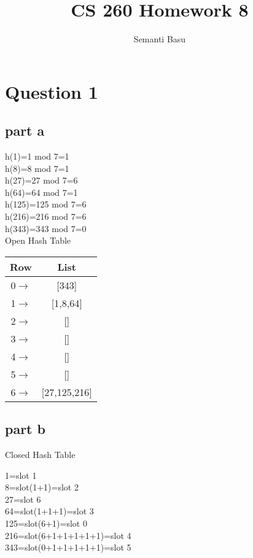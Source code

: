 \documentclass{article}
\begin{document}
\title {CS 260 Homework 8}
\author{Semanti Basu}
\maketitle


\section*{Question 1}
\subsection*{part a}
h(1)=1 mod 7=1\\
h(8)=8 mod 7=1\\
h(27)=27 mod 7=6\\
h(64)=64 mod 7=1\\
h(125)=125 mod 7=6\\
h(216)=216 mod 7=6\\
h(343)=343 mod 7=0\\

Open Hash Table



\begin{center}
\begin{tabular}{c|c|}
\hline
Row & List\\ \hline
0$\rightarrow$ & [343]\\ \hline
1$\rightarrow$ & [1,8,64]\\ \hline
2$\rightarrow$ & []\\ \hline
3$\rightarrow$ & []\\ \hline
4$\rightarrow$ & []\\ \hline
5$\rightarrow$ & []\\ \hline
6$\rightarrow$ & [27,125,216]\\ \hline
\end{tabular}
\end{center}


\subsection*{part b}


Closed Hash Table

1=slot 1\\
8=slot(1+1)=slot 2\\
27=slot 6\\
64=slot(1+1+1)=slot 3\\
125=slot(6+1)=slot 0\\
216=slot(6+1+1+1+1+1)=slot 4\\
343=slot(0+1+1+1+1+1)=slot 5\\
\end{document}
